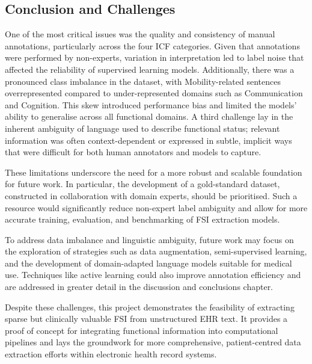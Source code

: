 \subsection{Conclusion and Challenges}
One of the most critical issues was the quality and consistency of manual annotations, particularly across the four ICF categories. Given that annotations were performed by non-experts, variation in interpretation led to label noise that affected the reliability of supervised learning models. Additionally, there was a pronounced class imbalance in the dataset, with Mobility-related sentences overrepresented compared to under-represented domains such as Communication and Cognition. This skew introduced performance bias and limited the models’ ability to generalise across all functional domains. A third challenge lay in the inherent ambiguity of language used to describe functional status; relevant information was often context-dependent or expressed in subtle, implicit ways that were difficult for both human annotators and models to capture.

These limitations underscore the need for a more robust and scalable foundation for future work. In particular, the development of a gold-standard dataset, constructed in collaboration with domain experts, should be prioritised. Such a resource would significantly reduce non-expert label ambiguity and allow for more accurate training, evaluation, and benchmarking of FSI extraction models. \medskip

To address data imbalance and linguistic ambiguity, future work may focus on the exploration of strategies such as data augmentation, semi-supervised learning, and the development of domain-adapted language models suitable for medical use. Techniques like active learning could also improve annotation efficiency and are addressed in greater detail in the discussion and conclusions chapter.\medskip

Despite these challenges, this project demonstrates the feasibility of extracting sparse but clinically valuable FSI from unstructured EHR text. It provides a proof of concept for integrating functional information into computational pipelines and lays the groundwork for more comprehensive, patient-centred data extraction efforts within electronic health record systems.